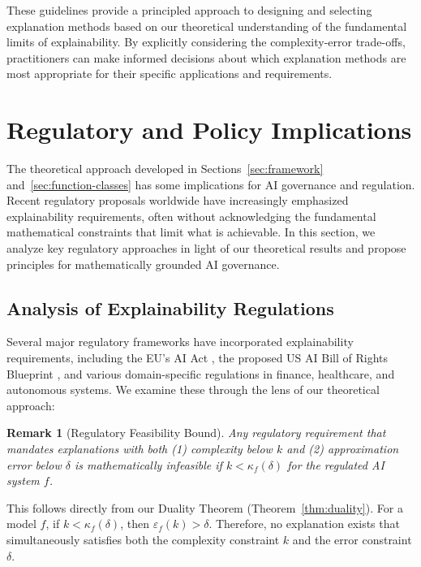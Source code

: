 \documentclass[11pt,letter,leqno]{article}
\newtheorem{remark}[theorem]{Remark}
\begin{document}
These guidelines provide a principled approach to designing and selecting explanation methods based on our theoretical understanding of the fundamental limits of explainability.  By explicitly considering the complexity-error trade-offs, practitioners can make informed decisions about which explanation methods are most appropriate for their specific applications and requirements.

\section{Regulatory and Policy Implications}
\label{sec:regulatory}

The theoretical approach developed in Sections~\ref{sec:framework} and~\ref{sec:function-classes} has some implications for AI governance and regulation.  Recent regulatory proposals worldwide have increasingly emphasized explainability requirements, often without acknowledging the fundamental mathematical constraints that limit what is achievable.  In this section, we analyze key regulatory approaches in light of our theoretical results and propose principles for mathematically grounded AI governance.

\subsection{Analysis of Explainability Regulations}
\label{subsec:regulatory-analysis}

Several major regulatory frameworks have incorporated explainability requirements, including the EU's AI Act \cite{EUAIAct2021}, the proposed US AI Bill of Rights Blueprint \cite{USAIBillRights2022}, and various domain-specific regulations in finance, healthcare, and autonomous systems.  We examine these through the lens of our theoretical approach:

\begin{remark}[Regulatory Feasibility Bound]
\label{thm:regulatory-feasibility}
Any regulatory requirement that mandates explanations with both (1) complexity below $k$ and (2) approximation error below $\delta$ is mathematically infeasible if $k < \kappa_f(\delta)$ for the regulated AI system $f$.
\end{remark}

This follows directly from our Duality Theorem (Theorem~\ref{thm:duality}). For a model $f$, if $k < \kappa_f(\delta)$, then $\varepsilon_f(k) > \delta$.  Therefore, no explanation exists that simultaneously satisfies both the complexity constraint $k$ and the error constraint $\delta$.
\end{document}
